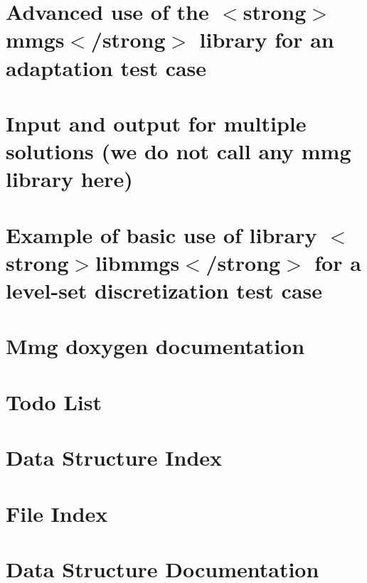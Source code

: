 \documentclass[twoside]{book}
\newcommand{\+}{\discretionary{\mbox{\scriptsize$\hookleftarrow$}}{}{}}
\begin{document}
\chapter{Advanced use of the \texorpdfstring{$<$}{<}strong\texorpdfstring{$>$}{>}mmgs\texorpdfstring{$<$}{<}/strong\texorpdfstring{$>$}{>} library for an adaptation test case}
\label{md_libexamples_mmgs_adaptation_example1_README}

\chapter{Input and output for multiple solutions (we do not call any mmg library here)}
\label{md_libexamples_mmgs_io_multisols_example3_README}

\chapter{Example of basic use of library \texorpdfstring{$<$}{<}strong\texorpdfstring{$>$}{>}libmmgs\texorpdfstring{$<$}{<}/strong\texorpdfstring{$>$}{>} for a level-\/set discretization test case}
\label{md_libexamples_mmgs_IsosurfDiscretization_example0_README}

\chapter{Mmg doxygen documentation}
\label{md_doc_doxygen_BUILD_DOXYGEN_DOC}

\chapter{Todo List}
\label{todo}

\chapter{Data Structure Index}

\chapter{File Index}

\chapter{Data Structure Documentation}


























\end{document}
